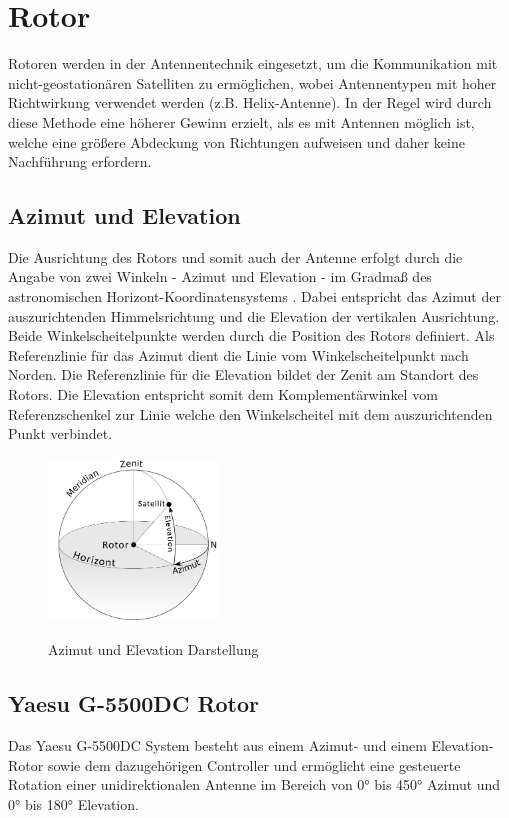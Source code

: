 \chapter{Rotor}
Rotoren werden in der Antennentechnik eingesetzt, um die Kommunikation mit nicht-geostationären Satelliten zu ermöglichen, wobei Antennentypen mit hoher Richtwirkung verwendet werden (z.B. Helix-Antenne). In der Regel wird durch diese Methode eine höherer Gewinn erzielt, als es mit Antennen möglich ist, welche eine größere Abdeckung von Richtungen aufweisen und daher keine Nachführung erfordern. 
\section{Azimut und Elevation}
Die Ausrichtung des Rotors und somit auch der Antenne erfolgt durch die Angabe von zwei Winkeln - Azimut und Elevation - im Gradmaß des astronomischen Horizont-Koordinatensystems \cite{noauthor_astronomische_nodate}. Dabei entspricht das Azimut der auszurichtenden Himmelsrichtung und die Elevation der vertikalen Ausrichtung. Beide Winkelscheitelpunkte werden durch die Position des Rotors definiert. Als Referenzlinie für das Azimut dient die Linie vom Winkelscheitelpunkt nach Norden. Die Referenzlinie für die Elevation bildet der Zenit am Standort des Rotors. Die Elevation entspricht somit dem Komplementärwinkel vom Referenzschenkel zur Linie welche den Winkelscheitel mit dem auszurichtenden Punkt verbindet.

\begin{figure}[H]
	\cite{twcarlson_azimuth_2020}
	\centering
	\includegraphics[width=4.5cm]{../ref/Azimuth-Altitude_schematic_satellit.png}
	\label{fig:Azimut_Elevation_Schematic}
	\caption{Azimut und Elevation Darstellung}
\end{figure}

\section{Yaesu G-5500DC Rotor}
\label{sec:yaesug5500dc}
Das Yaesu G-5500DC System \cite{noauthor_yaesu_nodate} besteht aus einem Azimut- und einem Elevation-Rotor sowie dem dazugehörigen Controller und ermöglicht eine gesteuerte Rotation einer unidirektionalen Antenne im Bereich von 0° bis 450° Azimut und 0° bis 180° Elevation.

